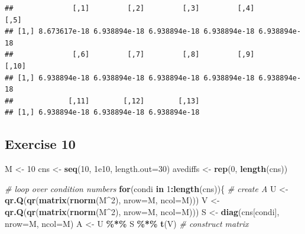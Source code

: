 \documentclass[
]{book}
\newenvironment{Shaded}{\begin{snugshade}}{\end{snugshade}}
\newcommand{\CommentTok}[1]{\textcolor[rgb]{0.56,0.35,0.01}{\textit{#1}}}
\newcommand{\ControlFlowTok}[1]{\textcolor[rgb]{0.13,0.29,0.53}{\textbf{#1}}}
\newcommand{\DataTypeTok}[1]{\textcolor[rgb]{0.13,0.29,0.53}{#1}}
\newcommand{\DecValTok}[1]{\textcolor[rgb]{0.00,0.00,0.81}{#1}}
\newcommand{\FloatTok}[1]{\textcolor[rgb]{0.00,0.00,0.81}{#1}}
\newcommand{\KeywordTok}[1]{\textcolor[rgb]{0.13,0.29,0.53}{\textbf{#1}}}
\newcommand{\NormalTok}[1]{#1}
\newcommand{\OperatorTok}[1]{\textcolor[rgb]{0.81,0.36,0.00}{\textbf{#1}}}
\newcommand{\StringTok}[1]{\textcolor[rgb]{0.31,0.60,0.02}{#1}}
\begin{document}
\begin{verbatim}
##              [,1]         [,2]         [,3]         [,4]         [,5]
## [1,] 8.673617e-18 6.938894e-18 6.938894e-18 6.938894e-18 6.938894e-18
##              [,6]         [,7]         [,8]         [,9]        [,10]
## [1,] 6.938894e-18 6.938894e-18 6.938894e-18 6.938894e-18 6.938894e-18
##             [,11]        [,12]        [,13]
## [1,] 6.938894e-18 6.938894e-18 6.938894e-18
\end{verbatim}

\hypertarget{exercise-10}{%
\subsection*{Exercise 10}\label{exercise-10}}

\begin{Shaded}
\begin{Highlighting}[]
\NormalTok{M \textless{}{-}}\StringTok{ }\DecValTok{10}
\NormalTok{cns \textless{}{-}}\StringTok{ }\KeywordTok{seq}\NormalTok{(}\DecValTok{10}\NormalTok{, }\FloatTok{1e10}\NormalTok{, }\DataTypeTok{length.out=}\DecValTok{30}\NormalTok{)}
\NormalTok{avediffs \textless{}{-}}\StringTok{ }\KeywordTok{rep}\NormalTok{(}\DecValTok{0}\NormalTok{, }\KeywordTok{length}\NormalTok{(cns))}

\CommentTok{\# loop over condition numbers  }
\ControlFlowTok{for}\NormalTok{(condi }\ControlFlowTok{in} \DecValTok{1}\OperatorTok{:}\KeywordTok{length}\NormalTok{(cns))\{}
  \CommentTok{\# create A}
\NormalTok{  U \textless{}{-}}\StringTok{ }\KeywordTok{qr.Q}\NormalTok{(}\KeywordTok{qr}\NormalTok{(}\KeywordTok{matrix}\NormalTok{(}\KeywordTok{rnorm}\NormalTok{(M}\OperatorTok{\^{}}\DecValTok{2}\NormalTok{), }\DataTypeTok{nrow=}\NormalTok{M, }\DataTypeTok{ncol=}\NormalTok{M)))}
\NormalTok{  V \textless{}{-}}\StringTok{ }\KeywordTok{qr.Q}\NormalTok{(}\KeywordTok{qr}\NormalTok{(}\KeywordTok{matrix}\NormalTok{(}\KeywordTok{rnorm}\NormalTok{(M}\OperatorTok{\^{}}\DecValTok{2}\NormalTok{), }\DataTypeTok{nrow=}\NormalTok{M, }\DataTypeTok{ncol=}\NormalTok{M)))}
\NormalTok{  S \textless{}{-}}\StringTok{ }\KeywordTok{diag}\NormalTok{(cns[condi], }\DataTypeTok{nrow=}\NormalTok{M, }\DataTypeTok{ncol=}\NormalTok{M)}
\NormalTok{  A \textless{}{-}}\StringTok{ }\NormalTok{U }\OperatorTok{\%*\%}\StringTok{ }\NormalTok{S }\OperatorTok{\%*\%}\StringTok{ }\KeywordTok{t}\NormalTok{(V) }\CommentTok{\# construct matrix }


\end{Highlighting}
\end{Shaded}
\end{document}
